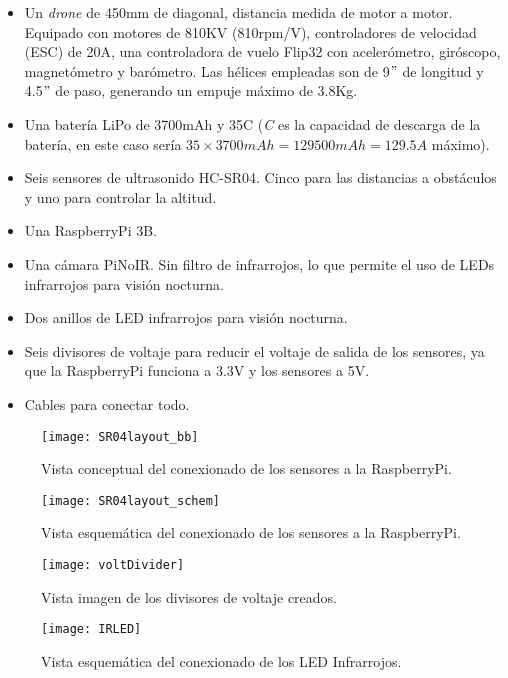 \begin{itemize}
\item Un \emph{drone} de 450mm de diagonal, distancia medida de motor a motor. Equipado con motores de 810KV (810rpm/V), controladores de velocidad (ESC) de 20A, una controladora de vuelo Flip32 con acelerómetro, giróscopo, magnetómetro y barómetro. Las hélices empleadas son de 9$"$ de longitud y 4.5$"$ de paso, generando un empuje máximo de 3.8Kg.
\item Una batería LiPo de 3700mAh y 35C (\emph{C} es la capacidad de descarga de la batería, en este caso sería $35 \times 3700mAh = 129500mAh = 129.5A$ máximo).
\item Seis sensores de ultrasonido HC-SR04. Cinco para las distancias a obstáculos y uno para controlar la altitud.
\item Una RaspberryPi 3B.
\item Una cámara PiNoIR. Sin filtro de infrarrojos, lo que permite el uso de LEDs infrarrojos para visión nocturna.
\item Dos anillos de LED infrarrojos para visión nocturna.
\item Seis divisores de voltaje para reducir el voltaje de salida de los sensores, ya que la RaspberryPi funciona a 3.3V y los sensores a 5V.
\item Cables para conectar todo.
\end{itemize}

\begin{figure}[H]
	\centering
	\texttt{[image: SR04layout\_bb]}
	\caption[Conceptual de conexión de sensores a RaspberryPi]{Vista conceptual del conexionado de los sensores a la RaspberryPi.}\label{fig:schHCPi}
\end{figure}

\begin{figure}[H]
	\centering
	\texttt{[image: SR04layout\_schem]}
	\caption[Diagrama de conexión de sensores a RaspberryPi]{Vista esquemática del conexionado de los sensores a la RaspberryPi.}\label{fig:concepHCPi}
\end{figure}

\begin{figure}[H]
	\centering
	\texttt{[image: voltDivider]}
	\caption[Divisor de voltaje]{Vista imagen de los divisores de voltaje creados.}\label{fig:imgVoltDiv}
\end{figure}

\begin{figure}[H]
	\centering
	\texttt{[image: IRLED]}
	\caption[LED IR]{Vista esquemática del conexionado de los LED Infrarrojos.}\label{fig:schIRLED}
\end{figure}

